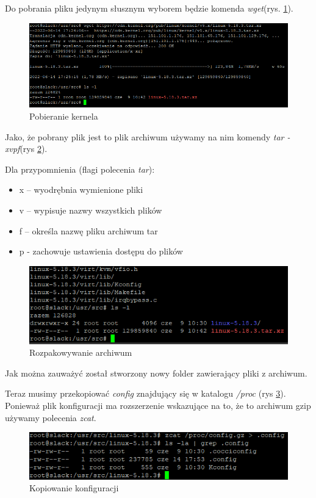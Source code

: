 \documentclass[a4paper,12pt,oneside]{book} %
\begin{document}
Do pobrania pliku jedynym słusznym wyborem będzie komenda \emph{wget}(rys. \ref{wget}).

\begin{figure}[h]
	\centering
	\includegraphics[scale=0.5]{02-wget}
	\caption{Pobieranie kernela}
	\label{wget}
\end{figure}

Jako, że pobrany plik jest to plik archiwum używamy na nim komendy \emph{tar -xvpf}(rys \ref{tar}).

Dla przypomnienia (flagi polecenia \emph{tar}):
\begin{itemize}
	\item x – wyodrębnia wymienione pliki
	\item v – wypisuje nazwy wszystkich plików
	\item f – określa nazwę pliku archiwum tar
	\item p - zachowuje ustawienia dostępu do plików
\end{itemize}

\begin{figure}[h]
	\centering
	\includegraphics[scale=0.5]{03-tar}
	\caption{Rozpakowywanie archiwum}
	\label{tar}
\end{figure}

Jak można zauważyć został stworzony nowy folder zawierający pliki z archiwum.

Teraz musimy przekopiować \emph{config} znajdujący się w katalogu \emph{/proc} (rys \ref{config}). Ponieważ plik konfiguracji ma rozszerzenie wskazujące na to, że to archiwum gzip używamy polecenia \emph{zcat}.

\begin{figure}[h]
	\centering
	\includegraphics[scale=0.6]{04-config}
	\caption{Kopiowanie konfiguracji}
	\label{config}
\end{figure}
\end{document}
